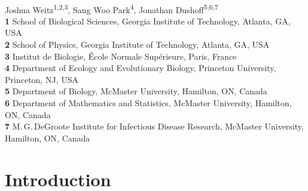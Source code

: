 \documentclass[12pt]{article}
\date{\today}
\begin{document}
\begin{flushleft}{
	\Large
	\textbf{}
}
\newline
\\
Joshua Weitz\textsuperscript{1,2,3},
Sang Woo Park\textsuperscript{4},
Jonathan Dushoff\textsuperscript{5,6,7}
\\
\bigskip
\textbf{1} School of Biological Sciences, Georgia Institute of Technology, Atlanta, GA, USA
\\
\textbf{2} School of Physics, Georgia Institute of Technology, Atlanta, GA, USA
\\
\textbf{3} Institut de Biologie, \'{E}cole Normale Sup\'{e}rieure, Paris, France
\\
\textbf{4} Department of Ecology and Evolutionary Biology, Princeton University, Princeton, NJ, USA
\\
\textbf{5} Department of Biology, McMaster University, Hamilton, ON, Canada
\\
\textbf{6} Department of Mathematics and Statistics, McMaster University, Hamilton, ON, Canada
\\
\textbf{7} M.\,G.\,DeGroote Institute for Infectious Disease Research, McMaster University, Hamilton, ON, Canada
\\
\bigskip

\bigskip
\end{flushleft}

\section{Introduction}
\end{document}
